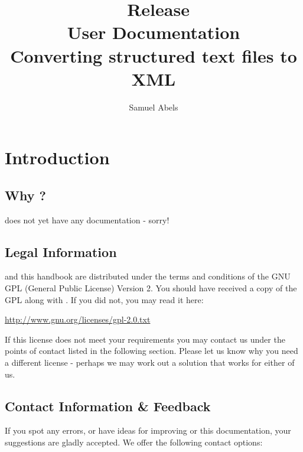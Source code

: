 \title{\productname\ Release \productversion\\
User Documentation\\
\vspace{5 mm}
\large Converting structured text files to XML}
\author{Samuel Abels}


\maketitle
\tableofcontents

\newpage
\section{Introduction}
\subsection{Why \productname?}

\product does not yet have any documentation - sorry!

\subsection{Legal Information}

\product and this handbook are distributed under the terms and conditions 
of the GNU GPL (General Public License) Version 2. You should have received 
a copy of the GPL along with \product. If you did not, you may read it here:

\vspace{1em}
\url{http://www.gnu.org/licenses/gpl-2.0.txt}
\vspace{1em}

If this license does not meet your requirements you may contact us under 
the points of contact listed in the following section. Please let us know 
why you need a different license - perhaps we may work out a solution 
that works for either of us.


\subsection{Contact Information \& Feedback}

If you spot any errors, or have ideas for improving \product or this 
documentation, your suggestions are gladly accepted.
We offer the following contact options: \\

